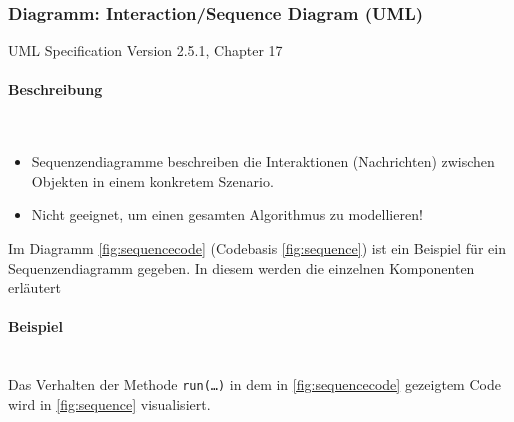 \documentclass[ngerman]{tuda_summary}
\begin{document}
\subsubsection{Diagramm: Interaction/Sequence Diagram (UML)}
\label{diagram:umlsequence}

{ \footnotesize UML Specification Version 2.5.1, Chapter 17}

\paragraph{Beschreibung}\mbox{}\\
\begin{itemize}
    \item Sequenzendiagramme beschreiben die Interaktionen (Nachrichten) zwischen Objekten in einem konkretem Szenario.
    \item Nicht geeignet, um einen gesamten Algorithmus zu modellieren!
\end{itemize}

Im Diagramm \ref{fig:sequencecode} (Codebasis \ref{fig:sequence}) ist ein Beispiel für ein Sequenzendiagramm gegeben. In diesem werden die einzelnen Komponenten erläutert

\paragraph{Beispiel}\mbox{}\\
Das Verhalten der Methode \texttt{run(\dots)} in dem in \ref{fig:sequencecode} gezeigtem Code  wird in \ref{fig:sequence} visualisiert.
\end{document}
